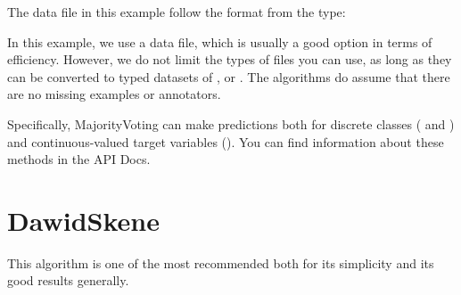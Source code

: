\documentclass[letterpaper,10pt,english]{sphinxmanual}
\begin{document}
The data file in this example follow the format from the  type:

%
\begin{sphinxVerbatim}[commandchars=\\\{\}]
  
                    
                    
                    
\end{sphinxVerbatim}

In this example, we use a  data file, which is usually a good option in terms of
efficiency. However, we do not limit the types of files you can use, as long as they can be
converted to typed datasets of ,  or .
The algorithms do assume that there are no missing examples or annotators.

Specifically, MajorityVoting can make predictions both for discrete classes ( and
) and continuous-valued target variables (). You can find
information about these methods in the API Docs.


\section{DawidSkene}
\label{\detokenize{usage/examples:dawidskene}}
This algorithm is one of the most recommended both for its simplicity and its good results generally. 
\end{document}

